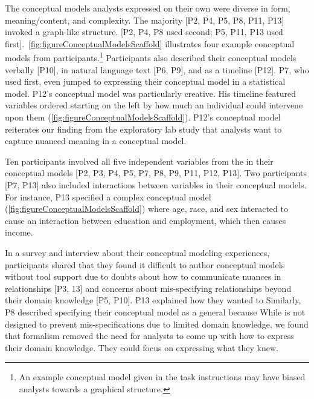 The conceptual models analysts expressed on their own were diverse in form,
meaning/content, and complexity. The majority [P2, P4, P5, P8, P11, P13] invoked
a graph-like structure. [P2, P4, P8 used \rTisane second; P5, P11, P13 used
\rTisane first].~\autoref{fig:figureConceptualModelsScaffold} illustrates four example conceptual
models from participants.\footnote{An example conceptual model given in the task instructions may
have biased analysts towards a graphical structure.} Participants also described
their conceptual models verbally [P10], in natural language text [P6, P9], and
as a timeline [P12]. P7, who used \rTisane first, even jumped to expressing
their conceptual model in a statistical model. P12's conceptual model was
particularly creative. His timeline featured variables ordered starting on the
left by how much an individual could intervene upon them (\autoref{fig:figureConceptualModelsScaffold}). P12's conceptual model reiterates our finding from the exploratory lab
study that analysts want to capture nuanced meaning in a conceptual model. 

Ten participants involved all five independent variables from the \dataSet in
their conceptual models [P2, P3, P4, P5, P7, P8, P9, P11, P12, P13]. Two
participants [P7, P13] also included interactions between variables in their
conceptual models. For instance, P13 specified a complex conceptual model
(\autoref{fig:figureConceptualModelsScaffold}) where age, race, and sex interacted to cause an
interaction between education and employment, which then causes income.

In a survey and interview about their conceptual modeling experiences,
participants shared that they found it difficult to author conceptual models
without tool support due to doubts about how to communicate nuances in
relationships [P3, 13] and concerns about mis-specifying relationships beyond
their domain knowledge [P5, P10]. P13 explained how they wanted to
 Similarly, P8 described
specifying their conceptual model as a general  because  While \rTisane is
not designed to prevent mis-specifications due to limited domain knowledge, we
found that \rTisanes formalism removed the need for analysts to come up with
how to express their domain knowledge. They could focus on expressing what they
knew. 

